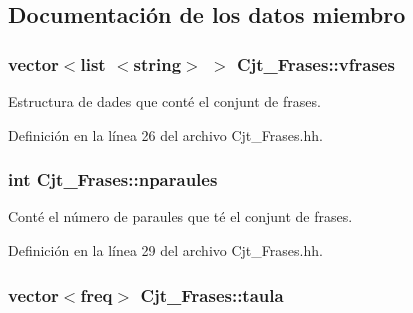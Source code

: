 \subsection{Documentación de los datos miembro}
\subsubsection[{\texorpdfstring{vfrases}{vfrases}}]{\setlength{\rightskip}{0pt plus 5cm}vector$<$list $<$string$>$ $>$ Cjt\+\_\+\+Frases\+::vfrases\hspace{0.3cm}{\ttfamily [private]}}\hypertarget{class_cjt___frases_a5323db427d06a961818c318d9ba79f3d}{}\label{class_cjt___frases_a5323db427d06a961818c318d9ba79f3d}


Estructura de dades que conté el conjunt de frases. 



Definición en la línea 26 del archivo Cjt\+\_\+\+Frases.\+hh.

\subsubsection[{\texorpdfstring{nparaules}{nparaules}}]{\setlength{\rightskip}{0pt plus 5cm}int Cjt\+\_\+\+Frases\+::nparaules\hspace{0.3cm}{\ttfamily [private]}}\hypertarget{class_cjt___frases_a026637b08f81acc25c6084146d73fc40}{}\label{class_cjt___frases_a026637b08f81acc25c6084146d73fc40}


Conté el número de paraules que té el conjunt de frases. 



Definición en la línea 29 del archivo Cjt\+\_\+\+Frases.\+hh.

\subsubsection[{\texorpdfstring{taula}{taula}}]{\setlength{\rightskip}{0pt plus 5cm}vector$<${\bf freq}$>$ Cjt\+\_\+\+Frases\+::taula\hspace{0.3cm}{\ttfamily [private]}}\hypertarget{class_cjt___frases_a2b7318b7d64136bc71479278db6e103e}{}\label{class_cjt___frases_a2b7318b7d64136bc71479278db6e103e}



